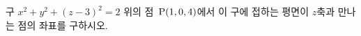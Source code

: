 구 $x^2+y^2+(z-3)^2=2$ 위의 점~$\mathrm{P}(1{,}\mkern3mu\mathopen{}0{,}\mkern3mu\mathopen{}4)$에서 이 구에 접하는 평면이 $z$축과 만나는 점의 좌표를 구하시오.
